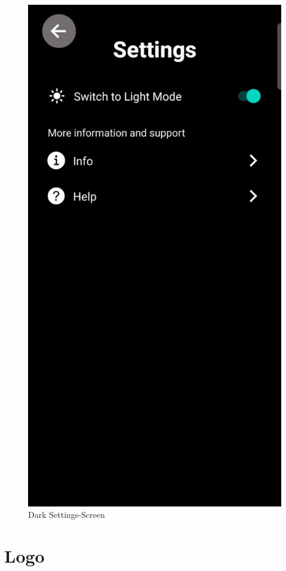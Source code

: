 \begin{figure}[H]
\begin{minipage}{0.5\textwidth}
        \centering
        \includegraphics[height=1.9\textwidth]{./pics/dSettings.jpg}
        \caption{Dark Settings-Screen}
    \end{minipage}
\end{figure}

\newpage

\section{Logo}

